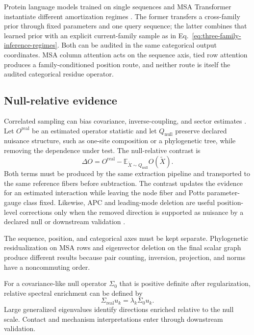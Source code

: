 \documentclass[10pt]{article}
\newcommand{\E}{\mathbb E}
\theoremstyle{definition}
\theoremstyle{remark}
\newcommand{\BookSection}[1]{\subsection{#1}}
\begin{document}
Protein language models trained on single sequences and MSA Transformer instantiate different
amortization regimes \cite{rives2021,rao2021}.  The former transfers a cross-family prior through
fixed parameters and one query sequence; the latter combines that learned prior with an explicit
current-family sample as in Eq.~\ref{eq:three-family-inference-regimes}.  Both can be audited in the
same categorical output coordinates.  MSA column attention acts on the sequence axis, tied row
attention produces a family-conditioned position route, and neither route is itself the audited
categorical residue operator.

\BookSection{Null-relative evidence}

Correlated sampling can bias covariance, inverse-coupling, and sector estimates
\cite{obermayer2014,dietler2022}.  Let $O^{\mathrm{real}}$ be an estimated operator statistic and
let $Q_{\mathrm{null}}$ preserve declared nuisance structure, such as one-site composition or a
phylogenetic tree, while removing the dependence under test.  The null-relative contrast is
\begin{equation}
\Delta O
=O^{\mathrm{real}}
-\E_{\widetilde X\sim Q_{\mathrm{null}}}O(\widetilde X).
\label{eq:null-contrast}
\end{equation}
Both terms must be produced by the same extraction pipeline and transported to the same reference
fibers before subtraction.  The contrast updates the evidence for an estimated interaction while
leaving the node fiber and Potts parameter-gauge class fixed.  Likewise, APC and leading-mode
deletion are useful position-level corrections only when the removed direction is supported as
nuisance by a declared null or downstream validation \cite{wang2024}.

The sequence, position, and categorical axes must be kept separate.  Phylogenetic residualization
on MSA rows and eigenvector deletion on the final scalar graph produce different results because
pair counting, inversion, projection, and norms have a noncommuting order.

For a covariance-like null operator $\Sigma_0$ that is positive definite after regularization, relative
spectral enrichment can be defined by
\begin{equation}
\Sigma_{\mathrm{real}}u_k=\lambda_k \Sigma_0u_k.
\label{eq:generalized-null-spectrum}
\end{equation}
Large generalized eigenvalues identify directions enriched relative to the null scale.  Contact
and mechanism interpretations enter through downstream validation.
\end{document}
